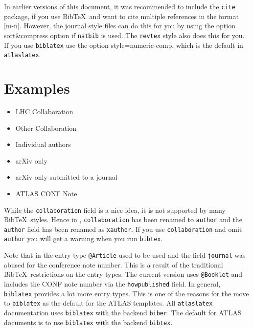 \documentclass[UKenglish,texlive=2013]{latex/atlasdoc}
\newcommand*{\BibTeX}{Bib\TeX}
\newcommand{\Option}[1]{\textsf{#1}\xspace}
\newcommand{\Package}[1]{\texttt{#1}\xspace}
\begin{document}
In earlier versions of this document, it was recommended to include the \Package{cite} package, 
if you use \BibTeX\ and want to cite multiple references in the format [m-n].
However, the journal style files can do this for you by using the option \Option{sort\&compress} option if \Package{natbib} is used.
The \texttt{revtex} style also does this for you.
If you use \texttt{biblatex} use the option \Option{style=numeric-comp},
which is the default in \Package{atlaslatex}.

\section{Examples}

\begin{itemize}
\item LHC Collaboration~\cite{lhcCollaboration:2012}
\item Other Collaboration~\cite{otherCollaboration:2007}
\item Individual authors~\cite{authors:2008}
\item arXiv only~\cite{arxivOnly:2009}
\item arXiv only submitted to a journal~\cite{arxivSub:2011}
\item ATLAS CONF Note~\cite{atlasConf:2012}
\end{itemize}

While the \texttt{collaboration} field is a nice idea, it is not supported by many \BibTeX\ styles.
Hence in , \texttt{collaboration} has been renamed to \texttt{author} and
the \texttt{author} field has been renamed as \texttt{xauthor}. If you use \texttt{collaboration} and omit
\texttt{author} you will get a warning when you run \texttt{bibtex}.

Note that in  the entry type \texttt{@Article} used to be used and the field \texttt{journal} 
was abused for the conference note number. This is a result of the traditional \BibTeX\ restrictions on the entry types.
The current version uses \texttt{@Booklet} and includes the CONF note number via the \texttt{howpublished} field.
In general, \texttt{biblatex} provides a lot more entry types.
This is one of the reasons for the  move to \texttt{biblatex} as the default for the ATLAS templates.
All \Package{atlaslatex} documentation uses \Package{biblatex} with the backend \Package{biber}.
The default for ATLAS documents is to use \Package{biblatex} with the backend \Package{bibtex}.
\end{document}
